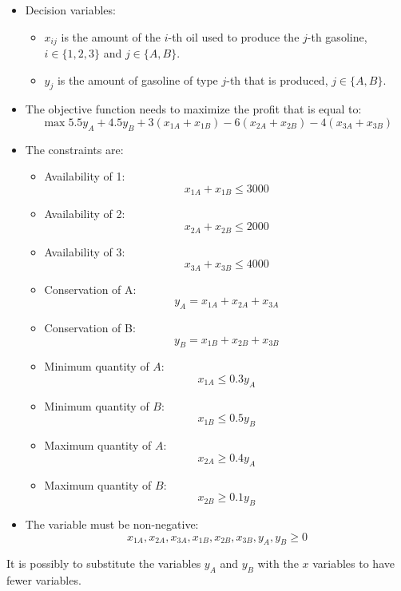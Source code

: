 \documentclass[12pt, a4paper]{report}
\newtheorem[style=M,bodystyle=\normalfont]{theorem}{Theorem}
\newtheorem[style=M,bodystyle=\normalfont]{corollary}{Corollary}
\newtheorem[style=M,bodystyle=\normalfont]{lemma}{Lemma}
\newtheorem[style=M,bodystyle=\normalfont]{definition}{Definition}
\begin{document}
\begin{Answer}[ref=2]
    \begin{itemize}
        \item Decision variables:
            \begin{itemize}
                \item $x_{ij}$ is the amount of the $i$-th oil used to produce the $j$-th gasoline, $i \in \{1,2,3\}$ and $j \in \{A,B\}$. 
                \item $y_j$ is the amount of gasoline of type $j$-th that is produced, $j \in \{A,B\}$. 
            \end{itemize}
        \item The objective function needs to maximize the profit that is equal to: 
            \[\max{5.5y_A+4.5y_B+3(x_{1A}+x_{1B})-6(x_{2A}+x_{2B})-4(x_{3A}+x_{3B})}\]
        \item The constraints are: 
            \begin{itemize}
                \item Availability of 1: 
                    \[x_{1A}+x_{1B} \leq 3 000\]
                \item Availability of 2:
                    \[x_{2A}+x_{2B} \leq 2 000\]
                \item Availability of 3:  
                    \[x_{3A}+x_{3B} \leq 4 000\]
                \item Conservation of A:
                    \[y_A=x_{1A}+x_{2A}+x_{3A}\]
                \item Conservation of B:
                    \[y_B=x_{1B}+x_{2B}+x_{3B}\]
                \item Minimum quantity of $A$: 
                    \[x_{1A} \leq 0.3y_A\]
                \item Minimum quantity of $B$: 
                    \[x_{1B} \leq 0.5y_B\]
                \item Maximum quantity of $A$: 
                    \[x_{2A} \geq 0.4y_A\]
                \item Maximum quantity of $B$: 
                    \[x_{2B} \geq 0.1y_B\]
            \end{itemize}
        \item The variable must be non-negative:
            \[x_{1A},x_{2A},x_{3A},x_{1B},x_{2B},x_{3B},y_A,y_B \geq 0\]  
    \end{itemize}
    It is possibly to substitute the variables $y_A$ and $y_B$ with the $x$ variables to have fewer variables. 
\end{Answer}
\end{document}
